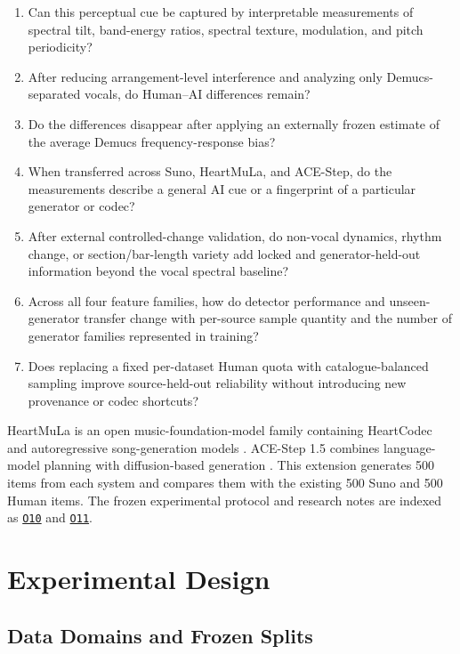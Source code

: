 \documentclass[11pt,a4paper]{article}
\newcommand{\outref}[1]{\hyperlink{output:#1}{\texttt{#1}}}
\begin{document}
\begin{enumerate}
  \item Can this perceptual cue be captured by interpretable measurements of spectral tilt, band-energy ratios, spectral texture, modulation, and pitch periodicity?
  \item After reducing arrangement-level interference and analyzing only Demucs-separated vocals, do Human--AI differences remain?
  \item Do the differences disappear after applying an externally frozen estimate of the average Demucs frequency-response bias?
  \item When transferred across Suno, HeartMuLa, and ACE-Step, do the measurements describe a general AI cue or a fingerprint of a particular generator or codec?
  \item After external controlled-change validation, do non-vocal dynamics, rhythm change, or section/bar-length variety add locked and generator-held-out information beyond the vocal spectral baseline?
  \item Across all four feature families, how do detector performance and unseen-generator transfer change with per-source sample quantity and the number of generator families represented in training?
  \item Does replacing a fixed per-dataset Human quota with catalogue-balanced sampling improve source-held-out reliability without introducing new provenance or codec shortcuts?
\end{enumerate}

HeartMuLa is an open music-foundation-model family containing HeartCodec and autoregressive song-generation models \citep{heartmula2026,heartlib2026}. ACE-Step 1.5 combines language-model planning with diffusion-based generation \citep{acestep2026,acestepcode2026}. This extension generates 500 items from each system and compares them with the existing 500 Suno and 500 Human items. The frozen experimental protocol and research notes are indexed as \outref{O10} and \outref{O11}.

\section{Experimental Design}
\label{sec:design}

\subsection{Data Domains and Frozen Splits}
\end{document}
